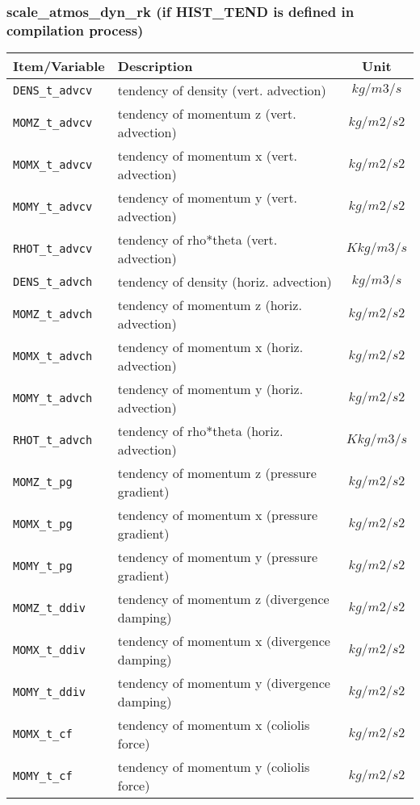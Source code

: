 \subsubsection{scale\_atmos\_dyn\_rk (if HIST\_TEND is defined in compilation process)}
 \begin{tabularx}{150mm}{|l|X|c|} \hline
 \rowcolor[gray]{0.9} Item/Variable & Description  & Unit \\\hline
  \verb|DENS_t_advcv| & tendency of density (vert. advection)    & $kg/m3/s$  \\\hline
  \verb|MOMZ_t_advcv| & tendency of momentum z (vert. advection) & $kg/m2/s2$ \\\hline
  \verb|MOMX_t_advcv| & tendency of momentum x (vert. advection) & $kg/m2/s2$ \\\hline
  \verb|MOMY_t_advcv| & tendency of momentum y (vert. advection) & $kg/m2/s2$ \\\hline
  \verb|RHOT_t_advcv| & tendency of rho*theta (vert. advection)  & $K kg/m3/s$  \\\hline
  \verb|DENS_t_advch| & tendency of density (horiz. advection)   & $kg/m3/s$  \\\hline
  \verb|MOMZ_t_advch| & tendency of momentum z (horiz. advection) & $kg/m2/s2$ \\\hline
  \verb|MOMX_t_advch| & tendency of momentum x (horiz. advection) & $kg/m2/s2$ \\\hline
  \verb|MOMY_t_advch| & tendency of momentum y (horiz. advection) & $kg/m2/s2$ \\\hline
  \verb|RHOT_t_advch| & tendency of rho*theta (horiz. advection)  & $K kg/m3/s$  \\\hline
  \verb|MOMZ_t_pg| & tendency of momentum z (pressure gradient)   & $kg/m2/s2$ \\\hline
  \verb|MOMX_t_pg| & tendency of momentum x (pressure gradient)   & $kg/m2/s2$ \\\hline
  \verb|MOMY_t_pg| & tendency of momentum y (pressure gradient)   & $kg/m2/s2$ \\\hline
  \verb|MOMZ_t_ddiv| & tendency of momentum z (divergence damping) & $kg/m2/s2$ \\\hline
  \verb|MOMX_t_ddiv| & tendency of momentum x (divergence damping) & $kg/m2/s2$ \\\hline
  \verb|MOMY_t_ddiv| & tendency of momentum y (divergence damping) & $kg/m2/s2$ \\\hline
  \verb|MOMX_t_cf| & tendency of momentum x (coliolis force)       & $kg/m2/s2$ \\\hline
  \verb|MOMY_t_cf| & tendency of momentum y (coliolis force)       & $kg/m2/s2$ \\\hline
 \end{tabularx}

